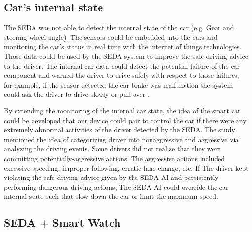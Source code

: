 \documentclass[main.tex]{subfiles}
\begin{document}


\subsection{Car’s internal state}

The SEDA was not able to detect the internal state of the car (e.g. Gear and steering wheel angle). The sensors could be embedded into the cars and monitoring the car’s status in real time with the internet of things technologies. Those data could be used by the SEDA system to improve the safe driving advice to the driver. The internal car data could detect the potential failure of the car component and warned the driver to drive safely with respect to those failures, for example, if the sensor detected the car brake was malfunction the system could ask the driver to drive slowly or pull over \cite{oliver2000graphical}.

By extending the monitoring of the internal car state, the idea of the smart car could be developed that our device could pair to control the car if there were any extremely abnormal activities of the driver detected by the SEDA. The study \cite{johnson2011driving} mentioned the idea of categorizing driver into nonaggressive and aggressive via analyzing the driving events. Some drivers did not realize that they were committing potentially-aggressive actions. The aggressive actions included excessive speeding, improper following, erratic lane change, etc. If The driver kept violating the safe driving advice given by the SEDA AI and persistently performing dangerous driving actions, The SEDA AI could override the car internal state such that slow down the car or limit the maximum speed.

\subsection{SEDA + Smart Watch}
\end{document}
